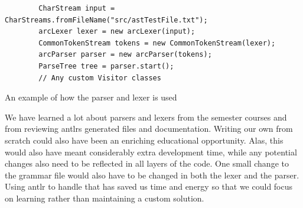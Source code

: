 \begin{listing}[htb!]
    \begin{verbatim}
        CharStream input = CharStreams.fromFileName("src/astTestFile.txt");
        arcLexer lexer = new arcLexer(input);
        CommonTokenStream tokens = new CommonTokenStream(lexer);
        arcParser parser = new arcParser(tokens);
        ParseTree tree = parser.start();
        // Any custom Visitor classes
    \end{verbatim}
    \caption{An example of how the parser and lexer is used}
    \label{lst:parserandlexerexample}
\end{listing}


We have learned a lot about parsers and lexers from the semester courses and from reviewing \gls{antlr}s generated files and documentation. Writing our own from scratch could also have been an enriching educational opportunity. Alas, this would also have meant considerably extra development time, while any potential changes also need to be reflected in all layers of the code. One small change to the grammar file would also have to be changed in both the lexer and the parser. Using \gls{antlr} to handle that has saved us time and energy so that we could focus on learning rather than maintaining a custom solution.